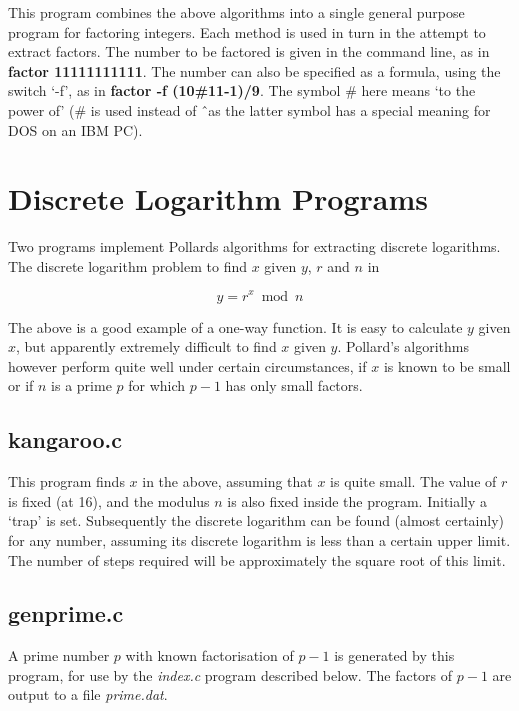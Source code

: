       This program combines the above algorithms into a single general purpose
      program for factoring integers. Each method is used in turn in the 
      attempt 
      to extract factors. The number to be factored is given in the command 
      line, as in {\bf factor 11111111111}. The number can also be specified as 
      a formula, using the switch `-f', as in {\bf factor -f (10\#11-1)/9}. The 
      symbol \# here means `to the power of' (\# is used instead of \^\  as the 
      latter symbol has a special meaning for DOS on an IBM PC).  

      \section{Discrete Logarithm Programs}

      Two programs implement Pollards algorithms \cite{Pollard2} for 
extracting discrete logarithms. The discrete logarithm problem to find $x$ 
given $y$, $r$ and $n$ in

             $$ y = r^{x} \bmod n $$

The above is a good example of a one-way function. It is easy 
to calculate $y$ given $x$, but apparently extremely difficult to find $x$ 
given $y$. Pollard's algorithms however perform quite well under certain 
circumstances, if $x$ is known to be small or if $n$ is a prime $p$ for which 
$p-1$ has only small factors.

     \subsection{kangaroo.c}

      This program finds $x$ in the above, assuming that $x$ is quite 
      small. The value of $r$ is fixed (at 16), and the modulus $n$ is also 
fixed inside the program. Initially a `trap' is set. Subsequently the discrete
logarithm can be found (almost certainly) for any number, assuming its 
discrete logarithm is less than a certain upper limit. The number of steps 
required will be approximately the square root of this limit.  

      \subsection{genprime.c}

      A prime number $p$ with known factorisation of $p-1$ is generated by 
this program, for use by the {\em index.c} program described below. The 
factors of $p-1$ are output to a file {\em prime.dat}.

